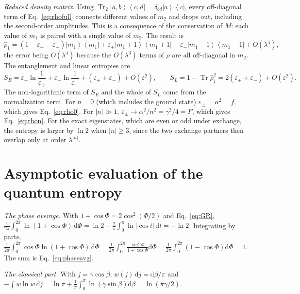 \documentclass[aps,preprint,12pt,superscriptaddress,nofootinbib]{revtex4-2}
\newcommand{\Tr}{\operatorname{Tr}}
\newcommand{\ketbra}[2]{\left|#1\right\rangle\!\left\langle#2\right|}
\newcommand{\dd}{\mathrm{d}}
\newcommand{\epsp}{\varepsilon_{+}}
\newcommand{\epsm}{\varepsilon_{-}}
\begin{document}
\emph{Reduced density matrix.} Using $\Tr_{2}\ketbra{a,b}{c,d}=\delta_{bd}\ketbra ac$,
every off-diagonal term of Eq.~\eqref{eq:rhofull} connects different values of $m_{2}$
and drops out, including the second-order amplitudes. This is a consequence of the
conservation of $M$: each value of $m_{1}$ is paired with a single value of $m_{2}$.
The result is
\begin{equation}
\hat\rho_{1}=\left(1-\epsp-\epsm\right)\ketbra{m_{1}}{m_{1}}
+\epsp\ketbra{m_{1}+1}{m_{1}+1}+\epsm\ketbra{m_{1}-1}{m_{1}-1}+O(\lambda^{4}),
\label{eq:rho1pt}
\end{equation}
the error being $O(\lambda^{4})$ because the $O(\lambda^{3})$ terms of $\rho$ are all
off-diagonal in $m_{2}$. The entanglement and linear entropies are
\begin{equation}
S_{E}=\epsp\ln\frac{1}{\epsp}+\epsm\ln\frac{1}{\epsm}+\left(\epsp+\epsm\right)
+O(\varepsilon^{2}),\qquad
S_{L}=1-\Tr\hat\rho_{1}^{2}=2\left(\epsp+\epsm\right)+O(\varepsilon^{2}).
\label{eq:Spt}
\end{equation}
The non-logarithmic term of $S_{E}$ and the whole of $S_{L}$ come from the
normalization term. For $n=0$ (which includes the ground state) $\varepsilon_{\pm}=
\alpha^{2}=f$, which gives Eq.~\eqref{eq:rho0}. For $|n|\gg1$,
$\varepsilon_{\pm}\to\alpha^{2}/n^{2}=\gamma^{2}/4=F$, which gives Eq.~\eqref{eq:rhon}.
For the exact eigenstates, which are even or odd under exchange, the entropy is larger
by $\ln2$ when $|n|\ge3$, since the two exchange partners then overlap only at order
$\lambda^{|n|}$.

\section{Asymptotic evaluation of the quantum entropy}
\label{app:asym}

\emph{The phase average.} With $1+\cos\Phi=2\cos^{2}(\Phi/2)$ and Eq.~\eqref{eq:GR},
$\frac{1}{2\pi}\int_{0}^{2\pi}\ln(1+\cos\Phi)\,\dd\Phi=\ln2+\frac{2}{\pi}\int_{0}^{\pi}
\ln|\cos t|\,\dd t=-\ln2$. Integrating by parts,
$\frac{1}{2\pi}\int_{0}^{2\pi}\cos\Phi\ln(1+\cos\Phi)\,\dd\Phi=\frac{1}{2\pi}\int_{0}^{2\pi}
\frac{\sin^{2}\Phi}{1+\cos\Phi}\dd\Phi=\frac{1}{2\pi}\int_{0}^{2\pi}(1-\cos\Phi)\dd\Phi=1$.
The sum is Eq.~\eqref{eq:phaseavg}.

\emph{The classical part.} With $j=\gamma\cos\beta$, $w(j)\,\dd j=\dd\beta/\pi$ and
$-\int w\ln w\,\dd j=\ln\pi+\frac1\pi\int_{0}^{\pi}\ln(\gamma\sin\beta)\dd\beta=\ln(\pi\gamma/2)$.
\end{document}

